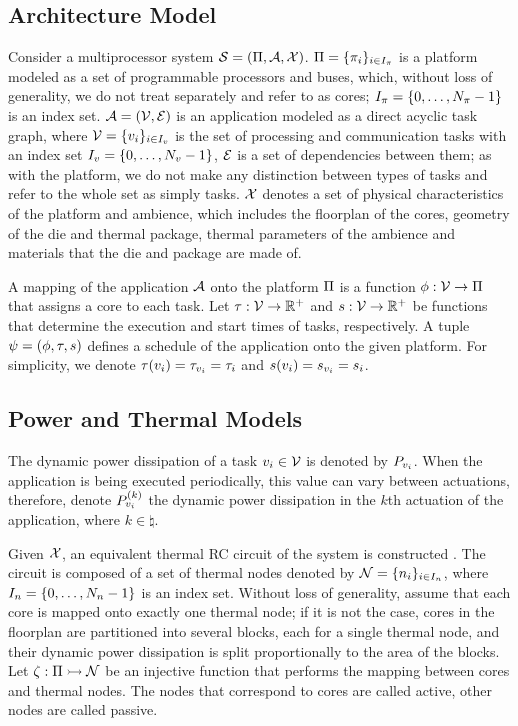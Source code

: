\subsection{Architecture Model}
Consider a multiprocessor system $\mathcal{S} = (\Pi, \mathcal{A}, \mathcal{X})$. $\Pi = \{ \pi_i \}_{i \in I_\pi}$ is a platform modeled as a set of programmable processors and buses, which, without loss of generality, we do not treat separately and refer to as cores; $I_\pi = \{0, \dots, N_\pi - 1\}$ is an index set. $\mathcal{A} = (\mathcal{V}, \mathcal{E})$ is an application modeled as a direct acyclic task graph, where $\mathcal{V} = \{ v_i \}_{i \in I_v}$ is the set of processing and communication tasks with an index set $I_v = \{ 0, \dots, N_v - 1 \}$, $\mathcal{E}$ is a set of dependencies between them; as with the platform, we do not make any distinction between types of tasks and refer to the whole set as simply tasks. $\mathcal{X}$ denotes a set of physical characteristics of the platform and ambience, which includes the floorplan of the cores, geometry of the die and thermal package, thermal parameters of the ambience and materials that the die and package are made of.

A mapping of the application $\mathcal{A}$ onto the platform $\Pi$ is a function $\phi: \mathcal{V} \to \Pi$ that assigns a core to each task. Let $\tau: \mathcal{V} \to \mathbb{R}^{+}$ and $s: \mathcal{V} \to \mathbb{R}^{+}$ be functions that determine the execution and start times of tasks, respectively. A tuple $\psi = (\phi, \tau, s)$ defines a schedule of the application onto the given platform. For simplicity, we denote $\tau(v_i) = \tau_{v_i} = \tau_i$ and $s(v_i) = s_{v_i} = s_i$.

\subsection{Power and Thermal Models}
The dynamic power dissipation of a task $v_i \in \mathcal{V}$ is denoted by $P_{v_i}$. When the application is being executed periodically, this value can vary between actuations, therefore, denote $P^{(k)}_{v_i}$ the dynamic power dissipation in the $k$th actuation of the application, where $k \in \natural$.

Given $\mathcal{X}$, an equivalent thermal RC circuit of the system is constructed \cite{kreith2000}. The circuit is composed of a set of thermal nodes denoted by $\mathcal{N} = \{ n_i \}_{i \in I_n}$, where $I_n = \{ 0, \dots, N_n - 1 \}$ is an index set. Without loss of generality, assume that each core is mapped onto exactly one thermal node; if it is not the case, cores in the floorplan are partitioned into several blocks, each for a single thermal node, and their dynamic power dissipation is split proportionally to the area of the blocks. Let $\zeta: \Pi \rightarrowtail \mathcal{N}$ be an injective function that performs the mapping between cores and thermal nodes. The nodes that correspond to cores are called active, other nodes are called passive.

